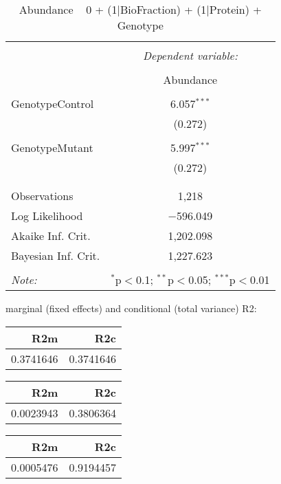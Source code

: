 \documentclass[11pt]{report}
\begin{document}
\begin{table}[!htbp] \centering 
  \caption{Abundance ~ 0 + (1|BioFraction) + (1|Protein) + Genotype} 
  \label{} 
\begin{tabular}{@{\extracolsep{5pt}}lc} 
\\[-1.8ex]\hline 
\hline \\[-1.8ex] 
 & \multicolumn{1}{c}{\textit{Dependent variable:}} \\ 
\cline{2-2} 
\\[-1.8ex] & Abundance \\ 
\hline \\[-1.8ex] 
 GenotypeControl & 6.057$^{***}$ \\ 
  & (0.272) \\ 
  & \\ 
 GenotypeMutant & 5.997$^{***}$ \\ 
  & (0.272) \\ 
  & \\ 
\hline \\[-1.8ex] 
Observations & 1,218 \\ 
Log Likelihood & $-$596.049 \\ 
Akaike Inf. Crit. & 1,202.098 \\ 
Bayesian Inf. Crit. & 1,227.623 \\ 
\hline 
\hline \\[-1.8ex] 
\textit{Note:}  & \multicolumn{1}{r}{$^{*}$p$<$0.1; $^{**}$p$<$0.05; $^{***}$p$<$0.01} \\ 
\end{tabular} 
\end{table} 
marginal (fixed effects) and conditional (total variance) R2:

\begin{tabular}{r|r}
\hline
R2m & R2c\\
\hline
0.3741646 & 0.3741646\\
\hline
\end{tabular}

\begin{tabular}{r|r}
\hline
R2m & R2c\\
\hline
0.0023943 & 0.3806364\\
\hline
\end{tabular}

\begin{tabular}{r|r}
\hline
R2m & R2c\\
\hline
0.0005476 & 0.9194457\\
\hline
\end{tabular}
\end{document}

